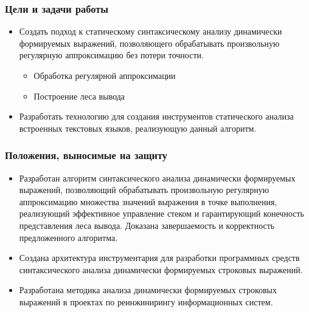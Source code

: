 \documentclass{beamer}
\begin{document}
\begin{frame}
    \transwipe[direction=90]
    \frametitle{Цели и задачи работы}
    \begin{itemize}
        \item Создать подход к статическому синтаксическому анализу динамически формируемых выражений, позволяющего обрабатывать произвольную регулярную аппроксимацию без потери точности.
        \begin{itemize}
            \item Обработка регулярной аппроксимации
            \item Построение леса вывода
        \end{itemize}
        \item Разработать технологию для создания инструментов статического анализа встроенных текстовых языков, реализующую данный алгоритм.
    \end{itemize}
\end{frame}

\begin{frame}
    \transwipe[direction=90]
    \frametitle{Положения, выносимые на защиту}
        \begin{itemize}
            \item Разработан алгоритм синтаксического анализа динамически формируемых выражений, позволяющий обрабатывать произвольную регулярную аппроксимацию множества значений выражения в точке выполнения, реализующий эффективное управление стеком и гарантирующий конечность представления леса вывода. Доказана завершаемость и корректность предложенного алгоритма.
            \item Создана архитектура инструментария для разработки программных средств синтаксического анализа динамически формируемых строковых выражений.
            \item Разработана методика анализа динамически формируемых строковых выражений в проектах по реинжинирингу информационных систем.  
        \end{itemize}
\end{frame}
\end{document}
